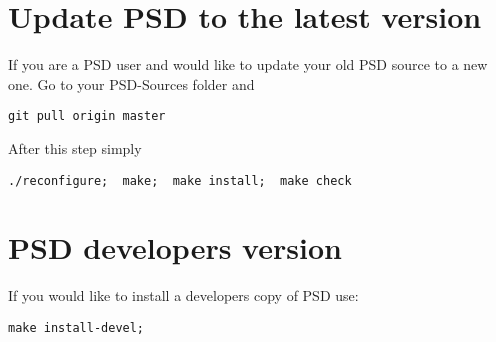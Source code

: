 \section{Update PSD to the latest version}

If you are a PSD user and would like to update your old PSD source to a new one. Go to your {\ttfamily PSD-Sources} folder and

\begin{lstlisting}[style=Linux]
git pull origin master
\end{lstlisting}

After this step simply

\begin{lstlisting}[style=Linux]
./reconfigure;  make;  make install;  make check
\end{lstlisting}

\section{PSD developers version}

If you would like to install  a developers copy  of PSD use:

\begin{lstlisting}[style=Linux]
make install-devel;
\end{lstlisting}
